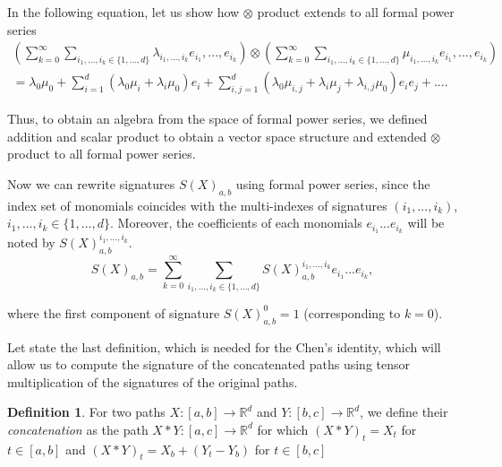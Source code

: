 \documentclass[12pt,a4paper]{report}
\theoremstyle{definition}
\newtheorem{definition}{Definition}
\begin{document}
In the following equation, let us show how $\otimes$ product extends to all formal power series
\begin{equation}
	\begin{aligned}
			(\sum_{k=0}^{\infty}\sum_{i_1, . . . , i_k \in \{1,...,d\}} \lambda_{i_1, . . . , i_k}e_{i_1}, . . . ,e_{i_k} )\otimes (\sum_{k=0}^{\infty}\sum_{i_1, . . . , i_k \in \{1,...,d\}}\mu_{i_1, . . . , i_k}e_{i_1}, . . . ,e_{i_k})\\
			=\lambda_0\mu_0 + \sum_{i=1}^{d}(\lambda_0\mu_i+\lambda_i\mu_0)e_i+\sum_{i,j=1}^{d}(\lambda_0\mu_{i,j}+\lambda_i\mu_j+\lambda_{i,j}\mu_0)e_i e_j+....
	\end{aligned}
\end{equation}

Thus, to obtain an algebra from the space of formal power series, we defined addition and scalar product to obtain a vector space structure and extended $\otimes$ product to all formal power series.

Now we can rewrite signatures $S(X)_{a,b}$ using formal power series, since the index set of monomials coincides with the multi-indexes of signatures $(i_1, . . . , i_k)$, $i_1, . . . , i_k \in \{1, . . . , d\}$. Moreover, the coefficients of each monomials $e_{i_1} . . . e_{i_k}$ will be noted by $S(X)_{a,b}^{i_1, . . . , i_k}$. 
\begin{equation}
	S(X)_{a,b}=	\sum_{k=0}^{\infty}\sum_{i_1, . . . , i_k \in \{1,...,d\}}S(X)_{a,b}^{i_1, . . . , i_k}e_{i_1} . . . e_{i_k},
\end{equation}

where the first component of signature $S(X)_{a,b}^0=1$ (corresponding to $k = 0$).

Let state the last definition, which is needed for the Chen’s identity, which will allow us to compute the signature of the concatenated paths using tensor multiplication of the signatures of the original paths.

\begin{definition}
	 For two paths $X:[a, b] \rightarrow \mathbb{R}^d$ and $Y: [b,c] \rightarrow \mathbb{R}^d $, we define their \textit{concatenation} as the path $X * Y : [a, c] \rightarrow \mathbb{R}^d$ for which $(X * Y )_t = X_t$ for $t\in [a, b]$ and $(X*Y )_t = X_b + (Y_t - Y_b)$ for $t\in[b,c]$
\end{definition}
\end{document}
